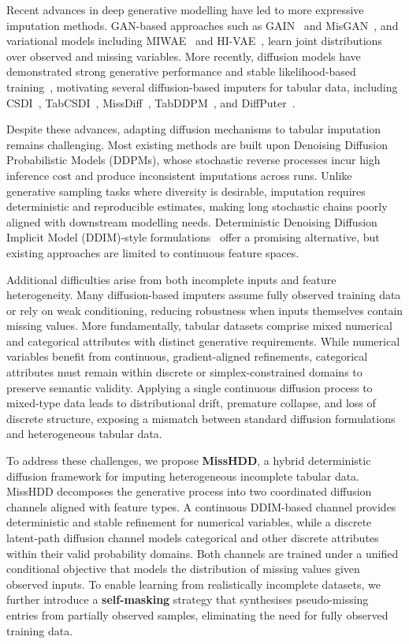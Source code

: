 \documentclass[times, review, 10pt]{elsarticle}
\begin{document}
Recent advances in deep generative modelling have led to more expressive imputation methods. GAN-based approaches such as GAIN~\cite{yoon2018gain} and MisGAN~\cite{misGAN}, and variational models including MIWAE~\cite{mattei2019miwae} and HI-VAE~\cite{hivae}, learn joint distributions over observed and missing variables. More recently, diffusion models have demonstrated strong generative performance and stable likelihood-based training~\cite{dm1,dm2,dreview1}, motivating several diffusion-based imputers for tabular data, including CSDI~\cite{csdi}, TabCSDI~\cite{tabcsdi}, MissDiff~\cite{missdiff}, TabDDPM~\cite{tabddpm}, and DiffPuter~\cite{diffputer}.

Despite these advances, adapting diffusion mechanisms to tabular imputation remains challenging. Most existing methods are built upon Denoising Diffusion Probabilistic Models (DDPMs), whose stochastic reverse processes incur high inference cost and produce inconsistent imputations across runs. Unlike generative sampling tasks where diversity is desirable, imputation requires deterministic and reproducible estimates, making long stochastic chains poorly aligned with downstream modelling needs. Deterministic Denoising Diffusion Implicit Model (DDIM)-style formulations~\cite{ddim,missddim} offer a promising alternative, but existing approaches are limited to continuous feature spaces.

Additional difficulties arise from both incomplete inputs and feature heterogeneity. Many diffusion-based imputers assume fully observed training data or rely on weak conditioning, reducing robustness when inputs themselves contain missing values. More fundamentally, tabular datasets comprise mixed numerical and categorical attributes with distinct generative requirements. While numerical variables benefit from continuous, gradient-aligned refinements, categorical attributes must remain within discrete or simplex-constrained domains to preserve semantic validity. Applying a single continuous diffusion process to mixed-type data leads to distributional drift, premature collapse, and loss of discrete structure, exposing a mismatch between standard diffusion formulations and heterogeneous tabular data.

To address these challenges, we propose \textbf{MissHDD}, a hybrid deterministic diffusion framework for imputing heterogeneous incomplete tabular data. MissHDD decomposes the generative process into two coordinated diffusion channels aligned with feature types. A continuous DDIM-based channel provides deterministic and stable refinement for numerical variables, while a discrete latent-path diffusion channel models categorical and other discrete attributes within their valid probability domains. Both channels are trained under a unified conditional objective that models the distribution of missing values given observed inputs. To enable learning from realistically incomplete datasets, we further introduce a \textbf{self-masking} strategy that synthesises pseudo-missing entries from partially observed samples, eliminating the need for fully observed training data.
\end{document}
